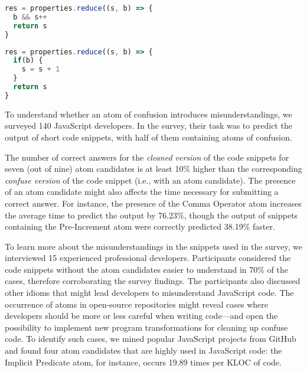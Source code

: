 \begin{figure*}[thb]
\noindent\begin{minipage}{.45\textwidth}  
\begin{lstlisting}[language=JavaScript]
res = properties.reduce((s, b) => {
  b && s++
  return s
}
\end{lstlisting}
\end{minipage}\hfill
\begin{minipage}{.45\textwidth}
\begin{lstlisting}[language=JavaScript]
res = properties.reduce((s, b) => {
  if(b) {
    s = s + 1
  }
  return s
}
\end{lstlisting}
\end{minipage}
\label{fig:lst01}
\end{figure*}

To understand whether an atom of confusion introduces misunderstandings,
we surveyed 140 JavaScript developers. In the survey, 
their task was to predict the output of short code
snippets, with half of them containing atoms of confusion. 
{\color{red}The number of correct answers for the
  \emph{cleaned version} of the code snippets for seven (out of nine)
  atom candidates is at least 10\% higher than the corresponding
  \emph{confuse version}
  of the code snippet (i.e., with an atom candidate). The presence of an atom candidate
  might also affects the time necessary for submitting a correct answer.
  For instance, the presence of the Comma Operator atom increases
  the average time to predict the output by 76.23\%, though the output of snippets containing
  the Pre-Increment atom were correctly predicted 38.19\% faster.
  
  To learn more about the misunderstandings in the snippets used in the survey, we interviewed 15
  experienced professional developers. Participants considered the code snippets without
  the atom candidates easier to understand in 70\% of the cases,
  therefore corroborating the survey findings. The participants also discussed other 
  idioms that might lead developers to misunderstand JavaScript code.
  The occurrence of atoms in open-source repositories might reveal cases where developers
  should be more or less careful when writing code---and open the possibility to implement
  new program transformations for cleaning up confuse code. To identify such cases, we mined popular JavaScript projects
  from GitHub and found four atom candidates that are highly used in JavaScript
  code: the Implicit Predicate atom, for instance, occurs 19.89 times per KLOC of
  code.}



